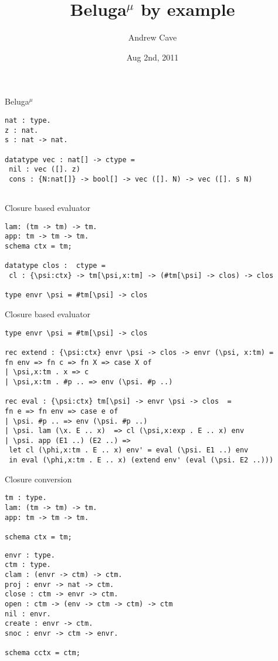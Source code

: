 \documentclass{beamer}
\title[]{Beluga$^\mu$ by example}
\author{Andrew Cave}
\date{Aug 2nd, 2011}
\begin{document}
\begin{frame}
\titlepage
\end{frame}

\begin{frame}[fragile]{Beluga$^\mu$}
\begin{lstlisting}
nat : type.
z : nat.
s : nat -> nat.

datatype vec : nat[] -> ctype =
 nil : vec ([]. z)
 cons : {N:nat[]} -> bool[] -> vec ([]. N) -> vec ([]. s N)
 
\end{lstlisting}
\end{frame}

\begin{frame}[fragile]{Closure based evaluator}
\begin{lstlisting}
lam: (tm -> tm) -> tm.              
app: tm -> tm -> tm.
schema ctx = tm;

datatype clos :  ctype =
 cl : {\psi:ctx} -> tm[\psi,x:tm] -> (#tm[\psi] -> clos) -> clos

type envr \psi = #tm[\psi] -> clos
\end{lstlisting}
\end{frame}

\begin{frame}[fragile]{Closure based evaluator}
\begin{lstlisting}
type envr \psi = #tm[\psi] -> clos

rec extend : {\psi:ctx} envr \psi -> clos -> envr (\psi, x:tm) =
fn env => fn c => fn X => case X of
| \psi,x:tm . x => c
| \psi,x:tm . #p .. => env (\psi. #p ..)

rec eval : {\psi:ctx} tm[\psi] -> envr \psi -> clos  =
fn e => fn env => case e of
| \psi. #p .. => env (\psi. #p ..)
| \psi. lam (\x. E .. x)  => cl (\psi,x:exp . E .. x) env
| \psi. app (E1 ..) (E2 ..) =>
 let cl (\phi,x:tm . E .. x) env' = eval (\psi. E1 ..) env
 in eval (\phi,x:tm . E .. x) (extend env' (eval (\psi. E2 ..)))
\end{lstlisting}
\end{frame}

\begin{frame}[fragile]{Closure conversion}

\begin{lstlisting}
tm : type.
lam: (tm -> tm) -> tm.              
app: tm -> tm -> tm.

schema ctx = tm;
\end{lstlisting}

\begin{lstlisting}
envr : type.
ctm : type.
clam : (envr -> ctm) -> ctm.
proj : envr -> nat -> ctm.
close : ctm -> envr -> ctm.
open : ctm -> (env -> ctm -> ctm) -> ctm
nil : envr.
create : envr -> ctm.
snoc : envr -> ctm -> envr.

schema cctx = ctm;
\end{lstlisting}
\end{frame}
\end{document}
